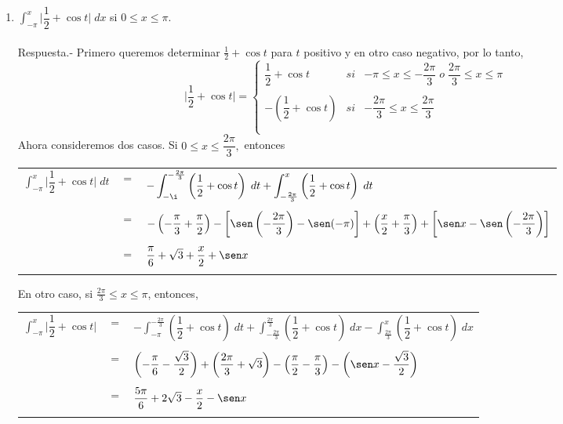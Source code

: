 \begin{enumerate}[\bfseries 1.]
\item $\displaystyle\int_{-\pi}^x \bigg|\dfrac{1}{2}+\cos t\bigg|\; dx$ si $0\leq x \leq \pi$.\\\\
    Respuesta.-\; Primero queremos determinar $\frac{1}{2}+\cos t$ para $t$ positivo y en otro caso negativo, por lo tanto,
    $$\bigg| \dfrac{1}{2}+\cos t \bigg| = \left\{\begin{array}{rcl}
	    \dfrac{1}{2}+\cos t&si&-\pi\leq x \leq -\dfrac{2\pi}{3}\; o \; \dfrac{2\pi}{3}\leq x \leq \pi\\\\
	    -\left(\dfrac{1}{2}+\cos t\right)&si&-\dfrac{2\pi}{3}\leq x \leq \dfrac{2\pi}{3}\\\\
    \end{array}\right.$$
    Ahora consideremos dos casos. Si $0\leq x \leq \dfrac{2\pi}{3},$ entonces 
    \begin{center}
	\begin{tabular}{rcl}
	    $\displaystyle\int_{-\pi}^x \bigg|\dfrac{1}{2}+\cos t\bigg|\; dt$&$=$&$-\displaystyle\int_{-\i}^{-\frac{2\pi}{3}}\left(\dfrac{1}{2}+\cos t\right)\; dt + \int_{-\frac{2\pi}{3}}^x \left(\dfrac{1}{2}+\cos t\right)\; dt$\\\\ &$=$&$-\left(-\dfrac{\pi}{3}+\dfrac{\pi}{2}\right)-\left[\sen\left(-\dfrac{2\pi}{3}\right)-\sen(-\pi)\right]+\left(\dfrac{x}{2}+\dfrac{\pi}{3}\right)+\left[\sen x - \sen \left(-\dfrac{2\pi}{3}\right)\right]$\\\\
									     &$=$&$\dfrac{\pi}{6}+\sqrt{3}+\dfrac{x}{2}+\sen x$\\\\
	\end{tabular}
    \end{center}

    En otro caso, si $\frac{2\pi}{3}\leq x \leq \pi$, entonces, 
    \begin{center}
	\begin{tabular}{rcl}
	    $\displaystyle\int_{-\pi}^{x} \bigg|\dfrac{1}{2}+\cos t\bigg|$&$=$&$-\displaystyle\int_{-\pi}^{-\frac{2\pi}{3}}\left(\dfrac{1}{2}+\cos t\right)\; dt + \int_{-\frac{2\pi}{3}}^{\frac{2\pi}{3}}\left(\dfrac{1}{2}+\cos t\right)\; dx - \int_{\frac{2\pi}{3}}^x \left(\dfrac{1}{2}+\cos t\right)\; dx$\\\\
									  &$=$&$\left(-\dfrac{\pi}{6}-\dfrac{\sqrt{3}}{2}\right)+\left(\dfrac{2\pi}{3}+\sqrt{3}\right)-\left(\dfrac{\pi}{2}-\dfrac{\pi}{3}\right)-\left(\sen x - \dfrac{\sqrt{3}}{2}\right)$\\\\
									  &$=$&$\dfrac{5\pi}{6}+2\sqrt{3} - \dfrac{x}{2}-\sen x$\\\\
	\end{tabular}
    \end{center}


\end{enumerate}
